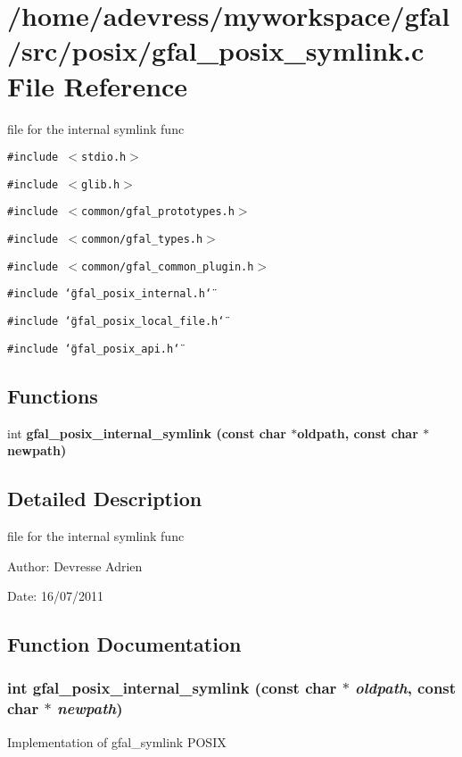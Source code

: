 \section{/home/adevress/myworkspace/gfal/src/posix/gfal\_\-posix\_\-symlink.c File Reference}
\label{gfal__posix__symlink_8c}
file for the internal symlink func 

{\tt \#include $<$stdio.h$>$}\par
{\tt \#include $<$glib.h$>$}\par
{\tt \#include $<$common/gfal\_\-prototypes.h$>$}\par
{\tt \#include $<$common/gfal\_\-types.h$>$}\par
{\tt \#include $<$common/gfal\_\-common\_\-plugin.h$>$}\par
{\tt \#include \char`\"{}gfal\_\-posix\_\-internal.h\char`\"{}}\par
{\tt \#include \char`\"{}gfal\_\-posix\_\-local\_\-file.h\char`\"{}}\par
{\tt \#include \char`\"{}gfal\_\-posix\_\-api.h\char`\"{}}\par
\subsection*{Functions}
\begin{CompactItemize}
\item 
int \bf{gfal\_\-posix\_\-internal\_\-symlink} (const char $\ast$oldpath, const char $\ast$newpath)
\end{CompactItemize}


\subsection{Detailed Description}
file for the internal symlink func 

\begin{Desc}
\item[Author:]Devresse Adrien \end{Desc}
\begin{Desc}
\item[Date:]16/07/2011 \end{Desc}


\subsection{Function Documentation}
\subsubsection{\setlength{\rightskip}{0pt plus 5cm}int gfal\_\-posix\_\-internal\_\-symlink (const char $\ast$ {\em oldpath}, const char $\ast$ {\em newpath})}\label{gfal__posix__symlink_8c_dc9e646bbdc504844fab47bdcb1699f0}


Implementation of gfal\_\-symlink POSIX 